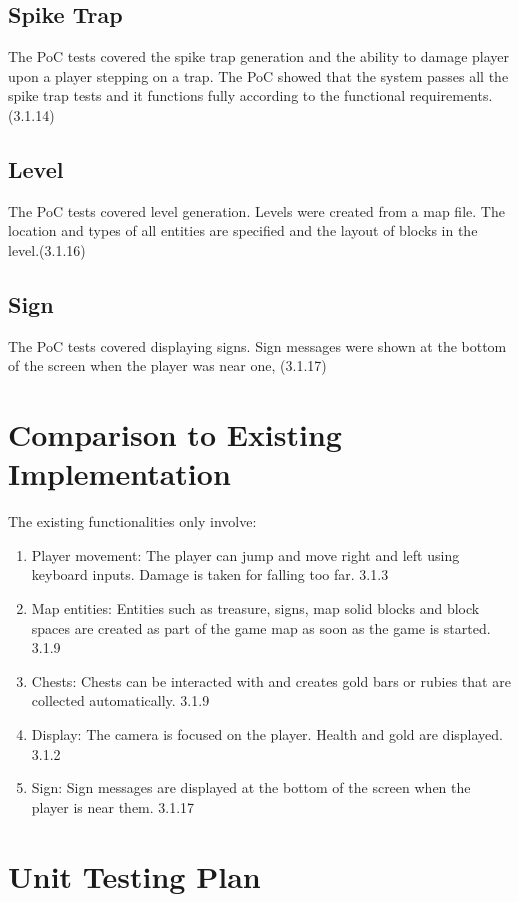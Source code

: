 \documentclass[12pt, titlepage]{article}
\begin{document}
\subsection{Spike Trap}
The PoC tests covered the spike trap generation and the ability to damage player upon a player stepping on a trap. The PoC showed that the system passes all the spike trap tests and it functions fully according to the functional requirements. (3.1.14)

\subsection{Level}
The PoC tests covered level generation. Levels were created from a map file. The location and types of all entities are specified and the layout of blocks in the level.(3.1.16)

\subsection{Sign}
The PoC tests covered displaying signs. Sign messages were shown at the bottom of the screen when the player was near one, (3.1.17)
	
\section{Comparison to Existing Implementation}	

The existing functionalities only involve:
\begin{enumerate}
\item{Player movement: The player can jump and move right and left using keyboard inputs. Damage is taken for falling too far. 3.1.3}
\item{Map entities: Entities such as treasure, signs, map solid blocks and block spaces are created as part of the game map as soon as the game is started. 3.1.9}
\item{Chests: Chests can be interacted with and creates gold bars or rubies that are collected automatically. 3.1.9}
\item{Display: The camera is focused on the player. Health and gold are displayed. 3.1.2}
\item{Sign: Sign messages are displayed at the bottom of the screen when the player is near them. 3.1.17}
\end{enumerate}
				
\section{Unit Testing Plan}
\end{document}
